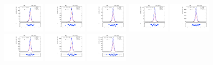 \begin{figure}[htb]
\centering
\includegraphics[width=0.19\textwidth]{plots/Appendix_Recoil_Fits/ZmmMC_PF_13TeV_2G/pfu2fit_0.pdf}
\includegraphics[width=0.19\textwidth]{plots/Appendix_Recoil_Fits/ZmmMC_PF_13TeV_2G/pfu2fit_1.pdf}
\includegraphics[width=0.19\textwidth]{plots/Appendix_Recoil_Fits/ZmmMC_PF_13TeV_2G/pfu2fit_2.pdf}
\includegraphics[width=0.19\textwidth]{plots/Appendix_Recoil_Fits/ZmmMC_PF_13TeV_2G/pfu2fit_3.pdf}
\includegraphics[width=0.19\textwidth]{plots/Appendix_Recoil_Fits/ZmmMC_PF_13TeV_2G/pfu2fit_4.pdf}
\includegraphics[width=0.19\textwidth]{plots/Appendix_Recoil_Fits/ZmmMC_PF_13TeV_2G/pfu2fit_5.pdf}
\includegraphics[width=0.19\textwidth]{plots/Appendix_Recoil_Fits/ZmmMC_PF_13TeV_2G/pfu2fit_6.pdf}
\includegraphics[width=0.19\textwidth]{plots/Appendix_Recoil_Fits/ZmmMC_PF_13TeV_2G/pfu2fit_7.pdf}

\end{figure}
